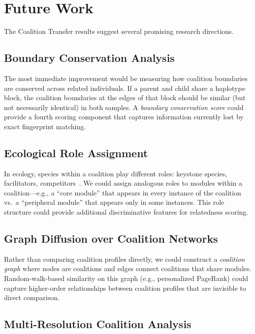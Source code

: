 \documentclass{../yalumba}
\begin{document}
\section{Future Work}
\label{sec:future}

The Coalition Transfer results suggest several promising research directions.

\subsection{Boundary Conservation Analysis}

The most immediate improvement would be measuring how coalition boundaries
are conserved across related individuals.  If a parent and child share a
haplotype block, the coalition boundaries at the edges of that block should
be similar (but not necessarily identical) in both samples.  A
\emph{boundary conservation score} could provide a fourth scoring component
that captures information currently lost by exact fingerprint matching.

\subsection{Ecological Role Assignment}

In ecology, species within a coalition play different roles: keystone species,
facilitators, competitors~\cite{bray1957}.  We could assign analogous roles
to modules within a coalition---e.g., a ``core module'' that appears in every
instance of the coalition vs.\ a ``peripheral module'' that appears only in
some instances.  This role structure could provide additional discriminative
features for relatedness scoring.

\subsection{Graph Diffusion over Coalition Networks}

Rather than comparing coalition profiles directly, we could construct a
\emph{coalition graph} where nodes are coalitions and edges connect
coalitions that share modules.  Random-walk-based similarity on this graph
(e.g., personalized PageRank) could capture higher-order relationships
between coalition profiles that are invisible to direct comparison.

\subsection{Multi-Resolution Coalition Analysis}
\end{document}
